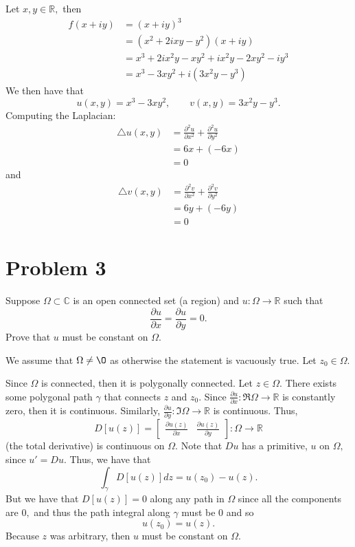 \documentclass[11pt]{article}
\newcommand{\bbC}{\mathbb{C}}
\newcommand{\bbR}{\mathbb{R}}
\renewcommand{\emptyset}{\O}
\begin{document}
\begin{solution}
    Let $x,y \in \bbR,$ then
    \begin{align*}
    f(x + iy) &= (x + iy)^3\\ &= (x^2 + 2ixy  -y^2)(x + iy)\\ &= x^3  + 2ix^2 y - xy^2 +ix^2y - 2xy^2 - iy^3\\ &= x^3 - 3xy^2  + i(3x^2 y - y^3)    
    \end{align*}
    We then have that 
    \[u(x,y) = x^3 - 3xy^2, \qquad v(x,y) = 3x^2y - y^3.\]
    Computing the Laplacian:
    \begin{align*}
        \triangle u(x,y) &= \frac{\partial^2 u}{\partial x^2} + \frac{\partial^2 u}{\partial y^2}\\
        &= 6x + (-6x)\\
        &= 0
    \end{align*}
    and
    \begin{align*}
        \triangle v(x,y) &= \frac{\partial^2 v}{\partial x^2} + \frac{\partial^2 v}{\partial y^2}\\
        &= 6y + (-6y)\\
        &= 0
    \end{align*}
\end{solution}

\newpage
\section*{Problem 3}
\begin{problem}
    Suppose $\Omega \subset \bbC$ is an open connected set (a region) and $u: \Omega \to \bbR$ such that 
    \[\frac{\partial u}{\partial x} =\frac{\partial u}{\partial y} = 0.\] Prove that $u$ must be constant on $\Omega.$
\end{problem}
\begin{solution}
We assume that $\Omega \neq \emptyset$ as otherwise the statement is vacuously true. Let $z_0 \in \Omega.$ 

Since $\Omega$ is connected, then it is polygonally connected. Let $z \in \Omega.$ There exists some polygonal path $\gamma$ that connects $z$ and $z_0.$ Since $\frac{\partial u}{\partial x}: \Re{\Omega} \to \bbR$ is constantly zero, then it is continuous. Similarly, $\frac{\partial u}{\partial y}: \Im{\Omega} \to \bbR$ is continuous. Thus, \[D[u(z)] = \begin{bmatrix}
    \frac{\partial u(z)}{\partial x} &  \frac{\partial u(z)}{\partial y}
\end{bmatrix}: \Omega \to \bbR\] (the total derivative) is continuous on $\Omega.$ Note that $Du$ has a primitive, $u$ on $\Omega,$ since $u' = Du.$ Thus, we have that
\[\int_\gamma D[u(z)] dz = u(z_0) - u(z). \] But we have that $D[u(z)] = 0$ along any path in $\Omega$ since all the components are $0,$ and thus the path integral along $\gamma$ must be $0$ and so
\[u(z_0) = u(z).\] Because $z$ was arbitrary, then $u$ must be constant on $\Omega.$
\end{solution}
\end{document}
